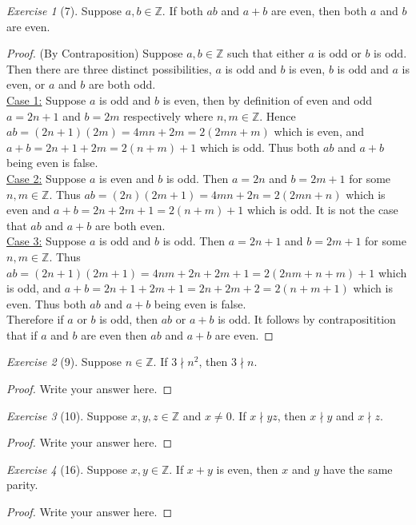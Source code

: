 \documentclass[12pt]{amsart}
\theoremstyle{remark}
\newtheorem*{exercise}{Exercise}%
\def\ZZ{\ensuremath{\mathbb Z}}
\theoremstyle{mycomment}
\begin{document}
\begin{exercise}[7] Suppose $a,b\in\ZZ$. If both $ab$ and $a+b$ are even, then both $a$ and $b$ are even.
\begin{proof}
	(By Contraposition) Suppose $a,b \in \ZZ$ such that either $a$ is odd or $b$ is odd. Then there are three distinct possibilities, $a$ is odd and $b$ is even, $b$ is odd and $a$ is even, or $a$ and $b$ are both odd. \\
	\underline{Case 1:} Suppose $a$ is odd and $b$ is even, then by definition of even and odd $a = 2n+1$ and $b = 2m$ respectively where $n,m \in \ZZ$. Hence $ab = (2n+1)(2m) = 4mn + 2m = 2(2mn+m)$ which is even, and $a + b = 2n+1 + 2m = 2(n + m) + 1$ which is odd. Thus both $ab$ and $a+b$ being even is false. \\ 
	\underline{Case 2:} Suppose $a$ is even and $b$ is odd. Then $a = 2n$ and $b = 2m+1$ for some $n,m \in \ZZ$. Thus $ab = (2n)(2m+1) = 4mn +2n = 2(2mn + n)$ which is even and $a + b = 2n + 2m+1 = 2(n+m) +1$ which is odd. It is not the case that $ab$ and $a+b$ are both even. \\
	\underline{Case 3:} Suppose $a$ is odd and $b$ is odd. Then $a = 2n + 1$ and $b = 2m + 1$ for some $n,m \in \ZZ$. Thus $ab = (2n+1)(2m+1) = 4nm +2n + 2m + 1 = 2(2nm + n + m) + 1$ which is odd, and $a + b = 2n+1 + 2m+1 = 2n + 2m + 2 = 2(n + m + 1)$ which is even. Thus both $ab$ and $a+b$ being even is false. \\
	Therefore if $a$ or $b$ is odd, then $ab$ or $a+b$ is odd. It follows by contrapositition that if $a$ and $b$ are even then $ab$ and $a+b$ are even.
\end{proof}
\end{exercise}

\begin{exercise}[9] Suppose $n\in\ZZ$. If $3\nmid n^{2}$, then $3\nmid n$. %
\begin{proof}
Write your answer here.
\end{proof}
\end{exercise}

\begin{exercise}[10] Suppose $x,y,z\in\ZZ$ and $x\ne 0$. %
If $x\nmid yz$, then $x\nmid y$ and $x\nmid z$.
\begin{proof}
Write your answer here.
\end{proof}
\end{exercise}

\begin{exercise}[16] Suppose $x,y\in\ZZ$. If $x+y$ is even, then $x$ and $y$ have the same parity.
\begin{proof}
Write your answer here.
\end{proof}
\end{exercise}
\end{document}
